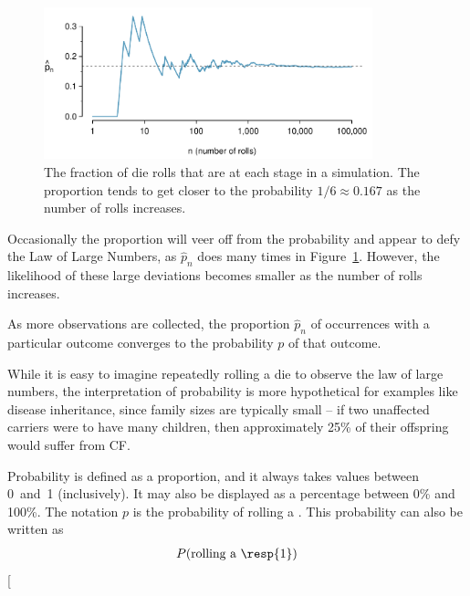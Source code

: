 \begin{figure}[h]
	\centering
	\includegraphics[width=0.85\textwidth]{ch_probability_oi_biostat/figures/dieProp/dieProp}
	\caption{The fraction of die rolls that are  at each stage in a simulation. The proportion tends to get closer to the probability $1/6 \approx 0.167$ as the number of rolls increases.}
	\label{fig:dieProp}
\end{figure}

Occasionally the proportion will veer off from the probability and appear to defy the Law of Large Numbers, as $\hat{p}_n$ does many times in Figure~\ref{fig:dieProp}. However, the likelihood of these large deviations becomes smaller as the number of rolls increases.

\begin{termBox}{
As more observations are collected, the proportion $\hat{p}_n$ of occurrences with a particular outcome converges to the probability $p$ of that outcome.}
\end{termBox}


While it is easy to imagine repeatedly rolling a die to observe the law of large numbers, the interpretation of probability is more hypothetical for examples like disease inheritance, since family sizes are typically small -- if two unaffected carriers were to have many children, then approximately 25\% of their offspring would suffer from CF.

Probability is defined as a proportion, and it always takes values between 0~and~1 (inclusively). It may also be displayed as a percentage between 0\% and 100\%. The notation $p$ is the probability of rolling a . This probability can also be written as
\begin{eqnarray*}
P(\text{rolling a \resp{1}})
\end{eqnarray*}
\marginpar[\raggedright\vspace{-13mm}

